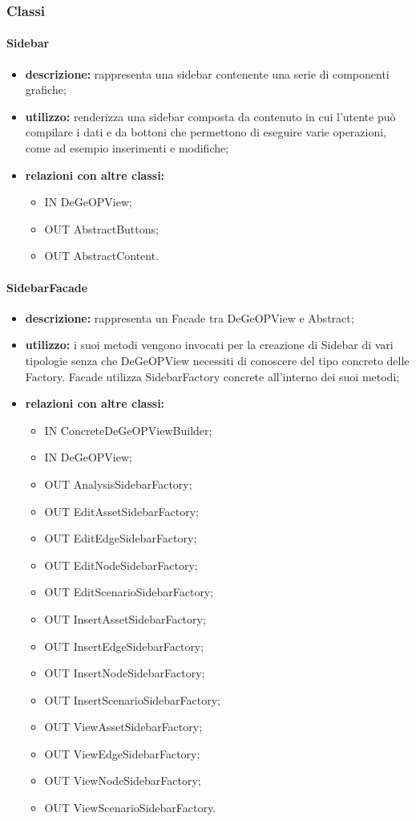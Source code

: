 \subsubsection{Classi}
\paragraph{Sidebar}
\begin{itemize}
	\item \textbf{descrizione:} rappresenta una sidebar contenente una serie di componenti grafiche;
	\item \textbf{utilizzo:} renderizza una sidebar composta da contenuto in cui l'utente può compilare i dati e da bottoni che permettono di eseguire varie operazioni, come ad esempio inserimenti e modifiche;
	\item \textbf{relazioni con altre classi:} 
	\begin{itemize}
		\item IN DeGeOPView;
		\item OUT AbstractButtons;
		\item OUT AbstractContent.
	\end{itemize}
\end{itemize}
\paragraph{SidebarFacade}
\begin{itemize}
	\item \textbf{descrizione:} rappresenta un Facade tra DeGeOPView e Abstract;
	\item \textbf{utilizzo:} i suoi metodi vengono invocati per la creazione di Sidebar di vari tipologie senza che DeGeOPView necessiti di conoscere del tipo concreto delle Factory. Facade utilizza SidebarFactory concrete all'interno dei suoi metodi;
	\item \textbf{relazioni con altre classi:} 
	\begin{itemize}
		\item IN ConcreteDeGeOPViewBuilder;
		\item IN DeGeOPView;
		\item OUT AnalysisSidebarFactory;
		\item OUT EditAssetSidebarFactory;
		\item OUT EditEdgeSidebarFactory;
		\item OUT EditNodeSidebarFactory;
		\item OUT EditScenarioSidebarFactory;
		\item OUT InsertAssetSidebarFactory;
		\item OUT InsertEdgeSidebarFactory;
		\item OUT InsertNodeSidebarFactory;
		\item OUT InsertScenarioSidebarFactory;
		\item OUT ViewAssetSidebarFactory;
		\item OUT ViewEdgeSidebarFactory;
		\item OUT ViewNodeSidebarFactory;
		\item OUT ViewScenarioSidebarFactory.
	\end{itemize}
\end{itemize}
\newpage
